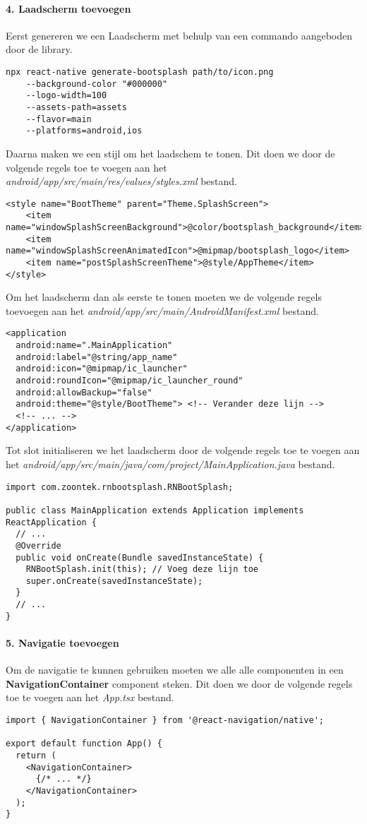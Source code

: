 \paragraph{4. Laadscherm toevoegen}
Eerst genereren we een Laadscherm met behulp van een commando aangeboden door de library.
\begin{verbatim}
npx react-native generate-bootsplash path/to/icon.png
    --background-color "#000000" 
    --logo-width=100 
    --assets-path=assets 
    --flavor=main 
    --platforms=android,ios
\end{verbatim}
Daarna maken we een stijl om het laadschem te tonen. Dit doen we door de volgende regels toe te
voegen aan het \textit{android/app/src/main/res/values/styles.xml} bestand.
\begin{verbatim}
<style name="BootTheme" parent="Theme.SplashScreen">
    <item name="windowSplashScreenBackground">@color/bootsplash_background</item>
    <item name="windowSplashScreenAnimatedIcon">@mipmap/bootsplash_logo</item>
    <item name="postSplashScreenTheme">@style/AppTheme</item>
</style>
\end{verbatim}
Om het laadscherm dan als eerste te tonen moeten we de volgende regels toevoegen aan het
\textit{android/app/src/main/AndroidManifest.xml} bestand.
\begin{verbatim}
<application
  android:name=".MainApplication"
  android:label="@string/app_name"
  android:icon="@mipmap/ic_launcher"
  android:roundIcon="@mipmap/ic_launcher_round"
  android:allowBackup="false"
  android:theme="@style/BootTheme"> <!-- Verander deze lijn -->
  <!-- ... -->
</application>
\end{verbatim}
Tot slot initialiseren we het laadscherm door de volgende regels toe te voegen aan het
\textit{android/app/src/main/java/com/project/MainApplication.java} bestand.
\begin{verbatim}
import com.zoontek.rnbootsplash.RNBootSplash;

public class MainApplication extends Application implements ReactApplication {
  // ...
  @Override
  public void onCreate(Bundle savedInstanceState) {
    RNBootSplash.init(this); // Voeg deze lijn toe
    super.onCreate(savedInstanceState);
  }
  // ...
}
\end{verbatim}

\paragraph{5. Navigatie toevoegen}
Om de navigatie te kunnen gebruiken moeten we alle alle componenten in een 
\textbf{NavigationContainer} component steken. Dit doen we door de volgende regels toe te voegen
aan het \textit{App.tsx} bestand.
\begin{verbatim}
import { NavigationContainer } from '@react-navigation/native';

export default function App() {
  return (
    <NavigationContainer>
      {/* ... */}
    </NavigationContainer>
  );
}
\end{verbatim}

